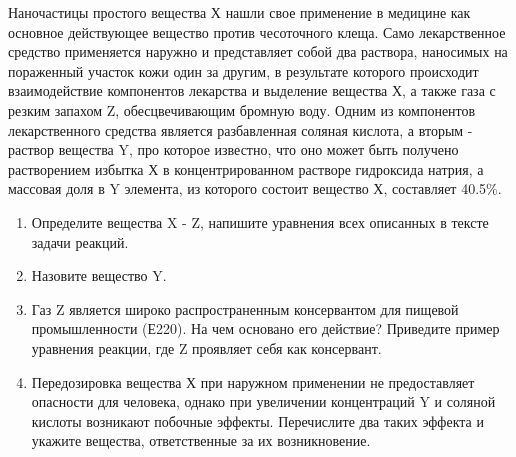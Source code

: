 
Наночастицы простого вещества Х нашли свое применение в медицине как основное действующее вещество против 
чесоточного клеща. Само лекарственное средство применяется наружно и представляет собой два раствора, наносимых 
на пораженный участок кожи один за другим, в результате которого происходит взаимодействие компонентов лекарства 
и выделение вещества Х, а также газа с резким запахом Z, обесцвечивающим бромную воду. Одним из компонентов 
лекарственного средства является разбавленная соляная кислота, а вторым - раствор вещества Y, про которое 
известно, что оно может быть получено растворением избытка Х в концентрированном растворе гидроксида натрия,  
а массовая доля в Y элемента, из которого состоит вещество Х, составляет 40.5\%.

\begin{enumerate}
    \item Определите вещества X - Z, напишите уравнения всех описанных в тексте задачи реакций.
    \item Назовите вещество Y.
    \item Газ Z является широко распространенным консервантом для пищевой промышленности (Е220). На чем основано его действие? 
    Приведите пример уравнения реакции, где Z проявляет себя как консервант.    
    \item Передозировка вещества Х при наружном применении не предоставляет опасности для человека, 
    однако при увеличении концентраций Y и соляной кислоты возникают побочные эффекты. Перечислите два 
    таких эффекта и укажите вещества, ответственные за их возникновение. 
\end{enumerate}


